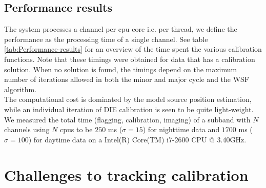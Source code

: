 \documentclass{aa}
\begin{document}
\subsection{Performance results}
The system processes a channel per cpu core i.e. per thread, we define the
performance as the processing time of a single channel. See table
\ref{tab:Performance-results} for an overview of the time spent the various
calibration functions. Note that these timings were obtained for data that has
a calibration solution. When no solution is found, the timings depend on the
maximum number of iterations allowed in both the minor and major cycle and the
WSF algorithm. \\
The computational cost is dominated by the model source position estimation,
while an individual iteration of DIE calibration is seen to be quite
light-weight. We measured the total time (flagging, calibration, imaging) of a
subband with $N$ channels using $N$ cpus to be $250$ ms ($\sigma = 15$) for
nighttime data and $1700$ ms ($\sigma = 100$) for daytime data on a Intel(R)
Core(TM) i7-2600 CPU @ 3.40GHz.
\begin{table}[tbh]

\caption{\label{tab:Performance-results} Overview of the time spent in
calibration function blocks for various datasets (daytime and nighttime). We
measured the overall time (flagging, calibrating, imaging) of an ACM to be
$250$ ms ($\sigma = 15$) for nighttime data and $1700$ ms ($\sigma = 100$) for
daytime data using current generation hardware.}
\end{table}

\section{\label{sec:Challenges-to-tracking}Challenges to tracking calibration}
\end{document}
